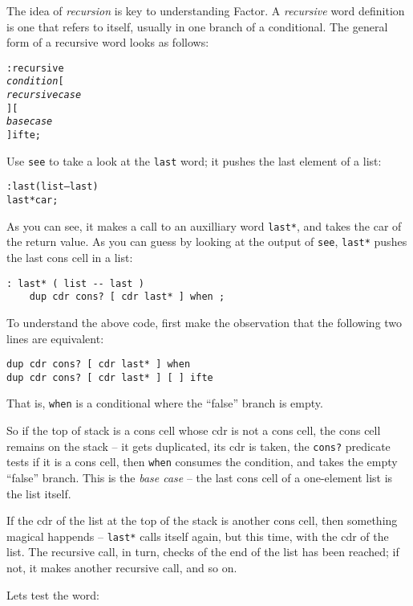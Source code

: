\documentclass[english]{book}
\begin{document}
The idea of \emph{recursion} is key to understanding Factor. A \emph{recursive} word definition is one that refers to itself, usually in one branch of a conditional. The general form of a recursive word looks as follows:

\begin{alltt}
: recursive
    \emph{condition} {[}
        \emph{recursive case}
    {] [}
        \emph{base case}
    {]} ifte ;
\end{alltt}

Use \texttt{see} to take a look at the \texttt{last} word; it pushes the last element of a list:

\begin{alltt}
: last ( list -- last )
    last* car ;
\end{alltt}

As you can see, it makes a call to an auxilliary word \texttt{last*}, and takes the car of the return value. As you can guess by looking at the output of \texttt{see}, \texttt{last*} pushes the last cons cell in a list:

\begin{verbatim}
: last* ( list -- last )
    dup cdr cons? [ cdr last* ] when ;
\end{verbatim}

To understand the above code, first make the observation that the following two lines are equivalent:

\begin{verbatim}
dup cdr cons? [ cdr last* ] when
dup cdr cons? [ cdr last* ] [ ] ifte
\end{verbatim}

That is, \texttt{when} is a conditional where the ``false'' branch is empty.

So if the top of stack is a cons cell whose cdr is not a cons cell, the cons cell remains on the stack -- it gets duplicated, its cdr is taken, the \texttt{cons?} predicate tests if it is a cons cell, then \texttt{when} consumes the condition, and takes the empty ``false'' branch. This is the \emph{base case} -- the last cons cell of a one-element list is the list itself.

If the cdr of the list at the top of the stack is another cons cell, then something magical happends -- \texttt{last*} calls itself again, but this time, with the cdr of the list. The recursive call, in turn, checks of the end of the list has been reached; if not, it makes another recursive call, and so on.

Lets test the word:
\end{document}
